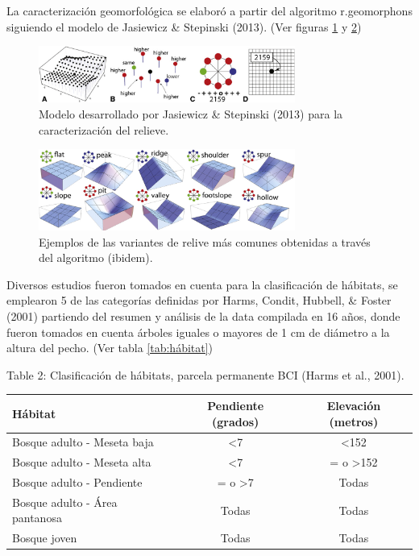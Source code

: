 \documentclass[11pt,]{article}
\begin{document}
La caracterización geomorfológica se elaboró a partir del algoritmo
r.geomorphons siguiendo el modelo de Jasiewicz \& Stepinski (2013). (Ver
figuras \ref{Geomorf3} y \ref{Geomorf2})

\begin{figure}
\centering
\includegraphics[width=0.75000\textwidth]{Geomorf3.png}
\caption{Modelo desarrollado por Jasiewicz \& Stepinski (2013) para la
caracterización del relieve.\label{Geomorf3}}
\end{figure}

\begin{figure}
\centering
\includegraphics[width=0.75000\textwidth]{Geomor2.png}
\caption{Ejemplos de las variantes de relive más comunes obtenidas a
través del algoritmo (ibidem).\label{Geomorf2}}
\end{figure}

Diversos estudios fueron tomados en cuenta para la clasificación de
hábitats, se emplearon 5 de las categorías definidas por Harms, Condit,
Hubbell, \& Foster (2001) partiendo del resumen y análisis de la data
compilada en 16 años, donde fueron tomados en cuenta árboles iguales o
mayores de 1 cm de diámetro a la altura del pecho. (Ver tabla
\ref{tab:hábitat})

Table 2: Clasificación de hábitats, parcela permanente BCI (Harms et
al., 2001).\label{tab:hábitat}

\begin{longtable}[]{@{}lcc@{}}
\toprule
Hábitat & Pendiente (grados) & Elevación (metros)\tabularnewline
\midrule
\endhead
Bosque adulto - Meseta baja & \textless{}7 &
\textless{}152\tabularnewline
Bosque adulto - Meseta alta & \textless{}7 & = o
\textgreater{}152\tabularnewline
Bosque adulto - Pendiente & = o \textgreater{}7 & Todas\tabularnewline
Bosque adulto - Área pantanosa & Todas & Todas\tabularnewline
Bosque joven & Todas & Todas\tabularnewline
\bottomrule
\end{longtable}
\end{document}
